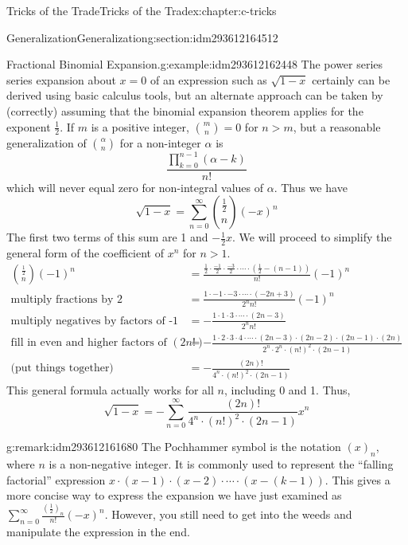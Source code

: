 \documentclass[twoside,10pt,]{book}
\numberwithin{equation}{section}
\newcommand{\gt}{>}
\begin{document}
\begin{chapterptx}{Tricks of the Trade}{}{Tricks of the Trade}{}{}{x:chapter:c-tricks}
\begin{sectionptx}{Generalization}{}{Generalization}{}{}{g:section:idm293612164512}
\begin{example}{Fractional Binomial Expansion.}{g:example:idm293612162448}%
%
The power series series expansion about \(x=0\) of an expression such as \(\sqrt{1-x}\) certainly can be derived using basic calculus tools, but an alternate approach can be taken by (correctly) assuming that the binomial expansion theorem applies for the exponent \(\frac{1}{2}\).  If \(m\) is a positive integer, \(\binom{m}{n} =0\) for \(n \gt m\), but a reasonable generalization of \(\binom{\alpha}{n}\) for a non-integer \(\alpha\) is%
\begin{equation*}
\frac{\prod_{k=0}^{n-1} (\alpha-k)}{n!}
\end{equation*}
which will never equal zero for non-integral values of \(\alpha\).  Thus we have%
\begin{equation*}
\sqrt{1-x} = \sum_{n=0}^{\infty} \binom{\frac{1}{2}}{n} (-x)^n
\end{equation*}
The first two terms of this sum are 1 and \(-\frac{1}{2} x\). We will proceed to simplify the general form of the coefficient of \(x^n\) for \(n \gt 1\).%
\begin{equation*}
\begin{split}
\binom{\frac{1}{2}}{n} (-1)^n
&=  \frac{\frac{1}{2} \cdot\frac{-1}{2}\cdot\frac{-3}{2}\cdot \cdots \cdot(\frac{1}{2}-(n-1)) }{n!} (-1)^n\\
\textrm{multiply fractions by 2 }	&=  \frac{1 \cdot -1 \cdot -3 \cdot \cdots \cdot (-2n+3)}{2^{n} n!} (-1)^n\\
\textrm{multiply negatives by factors of -1}	&= - \frac{1 \cdot 1 \cdot 3 \cdot \cdots \cdot (2n-3)}{2^{n} n!}  \\
\textrm{fill in even and higher factors of }(2n!)	&= - \frac{ 1 \cdot 2 \cdot 3\cdot 4 \cdot \cdots \cdot (2n-3)\cdot (2n-2)\cdot (2n-1)\cdot (2n)}{2^n\cdot 2^n\cdot (n!)^2 \cdot (2n-1)}  \\
\textrm{(put things together)}	&= - \frac{(2n)!}{4^n \cdot(n!)^2\cdot (2n-1)} 
\end{split}
\end{equation*}
This general formula actually works for all \(n\), including 0 and 1.   Thus,%
\begin{equation*}
\sqrt{1-x}  = - \sum_{n=0}^{\infty} \frac{(2n)!}{4^n \cdot(n!)^2\cdot (2n-1)}  x^n  
\end{equation*}
%
\end{example}
\begin{remark}{}{g:remark:idm293612161680}%
 The Pochhammer symbol is the notation  \((x)_n\), where \(n\) is a non-negative integer. It is commonly used to represent the ``falling factorial'' expression  \(x\cdot(x-1)\cdot(x-2)\cdot \cdots \cdot (x-(k-1))\).  This gives a more concise way to express the expansion we have just examined as \(\sum_{n=0}^{\infty} \frac{(\frac{1}{2})_n}{n!} (-x)^n\).  However, you still need to get into the weeds and manipulate the expression in the end.%

\end{remark}
\end{sectionptx}
\end{chapterptx}
\end{document}
